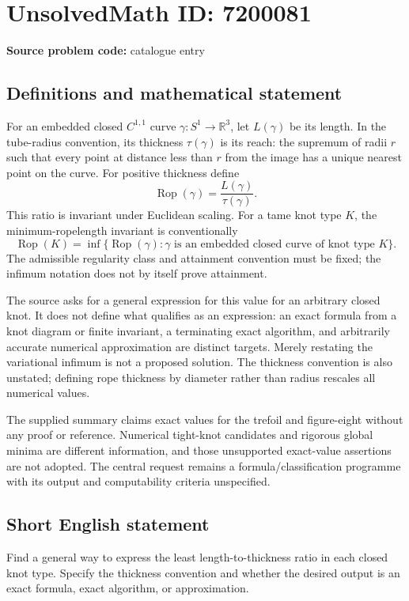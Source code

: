 \documentclass[11pt]{article}
\newcommand{\R}{\mathbb{R}}
\begin{document}
\section*{UnsolvedMath ID: 7200081}
\textbf{Source problem code:} catalogue entry
\subsection{Definitions and mathematical statement}
For an embedded closed $C^{1,1}$ curve $\gamma:S^1\to\R^3$, let $L(\gamma)$ be its length. In the tube-radius convention, its thickness $\tau(\gamma)$ is its reach: the supremum of radii $r$ such that every point at distance less than $r$ from the image has a unique nearest point on the curve. For positive thickness define
\[
\operatorname{Rop}(\gamma)=\frac{L(\gamma)}{\tau(\gamma)}.
\]
This ratio is invariant under Euclidean scaling. For a tame knot type $K$, the minimum-ropelength invariant is conventionally
\[
\operatorname{Rop}(K)=\inf\{\operatorname{Rop}(\gamma):\gamma\text{ is an embedded closed curve of knot type }K\}.
\]
The admissible regularity class and attainment convention must be fixed; the infimum notation does not by itself prove attainment.

The source asks for a general expression for this value for an arbitrary closed knot. It does not define what qualifies as an expression: an exact formula from a knot diagram or finite invariant, a terminating exact algorithm, and arbitrarily accurate numerical approximation are distinct targets. Merely restating the variational infimum is not a proposed solution. The thickness convention is also unstated; defining rope thickness by diameter rather than radius rescales all numerical values.

The supplied summary claims exact values for the trefoil and figure-eight without any proof or reference. Numerical tight-knot candidates and rigorous global minima are different information, and those unsupported exact-value assertions are not adopted. The central request remains a formula/classification programme with its output and computability criteria unspecified.
\subsection{Short English statement}
Find a general way to express the least length-to-thickness ratio in each closed knot type. Specify the thickness convention and whether the desired output is an exact formula, exact algorithm, or approximation.
\end{document}

